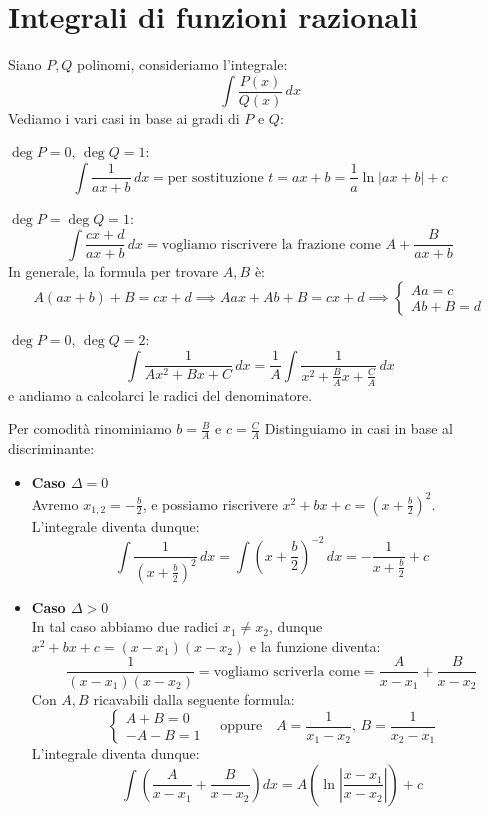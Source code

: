 \documentclass[12pt]{report}
\begin{document}
	\section{Integrali di funzioni razionali}
	Siano $P, Q$ polinomi, consideriamo l'integrale:
	\[
	\int \frac{P(x)}{Q(x)} \, dx
	\]
	Vediamo i vari casi in base ai gradi di $P$ e $Q$:
	\begin{description}
		
		\item $\deg P = 0,\, \deg Q = 1$:
		\[
		\int \frac{1}{ax+b} \, dx = \text{per sostituzione } t = ax+b = \frac{1}{a} \ln|ax+b| + c
		\]
		
		\item $\deg P = \deg Q = 1$:
		\[
		\int \frac{cx+d}{ax+b} \, dx = \text{vogliamo riscrivere la frazione come } A + \frac{B}{ax+b}
		\]
		In generale, la formula per trovare $A, B$ è:
		\[
		A(ax+b) + B = cx+d \implies Aax + Ab + B = cx+d \implies \begin{cases} Aa = c \\ Ab + B = d \end{cases}
		\]
		
		\item $\deg P = 0,\, \deg Q = 2$:
		\[
		\int \frac{1}{Ax^2 + Bx + C} \, dx = \frac{1}{A} \int \frac{1}{x^2 + \frac{B}{A}x + \frac{C}{A}} \, dx
		\]
		e andiamo a calcolarci le radici del denominatore.
		
		Per comodità rinominiamo $b = \frac{B}{A}$ e $c = \frac{C}{A}$
		Distinguiamo in casi in base al discriminante:
		
		\begin{itemize}
			
			\item \textbf{Caso $\Delta = 0$}\\
			Avremo $x_{1,2} = -\frac{b}{2}$, e possiamo riscrivere $x^2 + bx + c = \left(x + \frac{b}{2}\right)^2$.\\
			L'integrale diventa dunque:
			\[
			\int \frac{1}{\left(x + \frac{b}{2}\right)^2} \, dx = \int \left(x + \frac{b}{2}\right)^{-2} \, dx = -\frac{1}{x + \frac{b}{2}} + c
			\]
			
			\item \textbf{Caso $\Delta > 0$}\\
			In tal caso abbiamo due radici $x_1 \neq x_2$, dunque $x^2 + bx + c = (x - x_1)(x - x_2)$ e la funzione diventa:
			\[
			\frac{1}{(x - x_1)(x - x_2)} = \text{vogliamo scriverla come} = \frac{A}{x - x_1} + \frac{B}{x - x_2}
			\]
			Con $A, B$ ricavabili dalla seguente formula:
			\[
			\begin{cases}
				A + B = 0 \\
				-A - B = 1
			\end{cases}
			\quad \text{oppure} \quad
			A = \frac{1}{x_1 - x_2}, \, B = \frac{1}{x_2 - x_1}
			\]
			L'integrale diventa dunque:
			\[
			\int \left( \frac{A}{x - x_1} + \frac{B}{x - x_2} \right) dx = A \left( \ln\left|\frac{x - x_1}{x - x_2}\right| \right) + c
			\]
			

\end{itemize}
\end{description}
\end{document}
